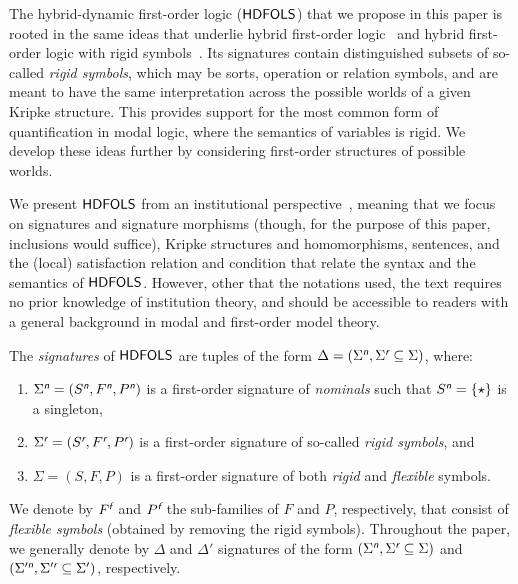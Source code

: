 \documentclass[a4paper,UKenglish,cleveref,autoref]{lipics-v2019}
\begin{document}
The hybrid-dynamic first-order logic (\({\mathsf{HDFOLS}}\)) that we propose in this paper is rooted in the same ideas that underlie hybrid first-order logic~\cite{Brauner11} and hybrid first-order logic with rigid symbols~\cite{DiaconescuM16,Diaconescu16}. 
Its signatures contain distinguished subsets of so-called \emph{rigid symbols}, which may be sorts, operation or relation symbols, and are meant to have the same interpretation across the possible worlds of a given Kripke structure.
This provides support for the most common form of quantification in modal logic, where the semantics of variables is rigid.
We develop these ideas further by considering first-order structures of possible worlds.

We present \({\mathsf{HDFOLS}}\) from an institutional perspective~\cite{GoguenB92}, meaning that we focus on signatures and signature morphisms (though, for the purpose of this paper, inclusions would suffice), Kripke structures and homomorphisms, sentences, and the (local) satisfaction relation and condition that relate the syntax and the semantics of \({\mathsf{HDFOLS}}\).
However, other that the notations used, the text requires no prior knowledge of institution theory, and should be accessible to readers with a general background in modal and first-order model theory.

The \emph{signatures} of \({\mathsf{HDFOLS}}\) are tuples of the form \(\Delta = (\Sigma^{\text{\normalfont\sffamily\itshape n}}, \Sigma^{\text{\normalfont\sffamily\itshape r}} \subseteq \Sigma)\), where:
\begin{enumerate}
  
\item \(\Sigma^{\text{\normalfont\sffamily\itshape n}} = (S^{\text{\normalfont\sffamily\itshape n}}, F^{\text{\normalfont\sffamily\itshape n}}, P^{\text{\normalfont\sffamily\itshape n}})\) is a first-order signature of \emph{nominals} such that \(S^{\text{\normalfont\sffamily\itshape n}} = \{\star\}\) is a singleton,

\item \(\Sigma^{\text{\normalfont\sffamily\itshape r}} = (S^{\text{\normalfont\sffamily\itshape r}}, F^{\text{\normalfont\sffamily\itshape r}}, P^{\text{\normalfont\sffamily\itshape r}})\) is a first-order signature of so-called \emph{rigid symbols}, and

\item \(\Sigma = (S, F, P)\) is a first-order signature of both \emph{rigid} and \emph{flexible} symbols.
  
\end{enumerate}
We denote by \(F^{\text{\normalfont\sffamily\itshape f}}\) and \(P^{\text{\normalfont\sffamily\itshape f}}\) the sub-families of \(F\) and \(P\), respectively, that consist of \emph{flexible symbols} (obtained by removing the rigid symbols).
Throughout the paper, we generally denote by \(\Delta\) and \(\Delta'\) signatures of the form \((\Sigma^{\text{\normalfont\sffamily\itshape n}}, \Sigma^{\text{\normalfont\sffamily\itshape r}} \subseteq \Sigma)\) and \((\Sigma'^{\text{\normalfont\sffamily\itshape n}}, \Sigma'^{\text{\normalfont\sffamily\itshape r}} \subseteq \Sigma')\), respectively.
\end{document}
